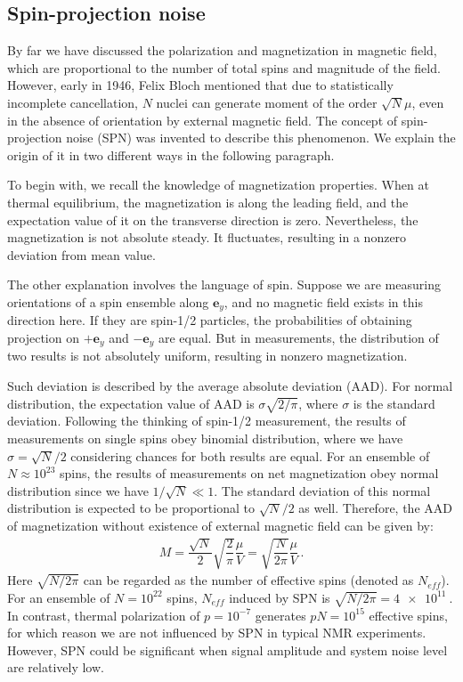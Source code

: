 \subsection{Spin-projection noise}\label{sec:intro:NMR:SPN}

By far we have discussed the polarization and magnetization in magnetic field, which are proportional to the number of total spins and magnitude of the field. However, early in 1946, Felix Bloch mentioned that due to statistically incomplete cancellation, $N$ nuclei can generate moment of the order $\sqrt{N}\mu$, even in the absence of orientation by external magnetic field\cite{Bloch_NuclearInduction_PhysRev.70.460}. The concept of spin-projection noise (SPN) was invented to describe this phenomenon. We explain the origin of it in two different ways in the following paragraph. 

To begin with, we recall the knowledge of magnetization properties. When at thermal equilibrium, the magnetization is along the leading field, and the expectation value of it on the transverse direction is zero. Nevertheless, the magnetization is not absolute steady. It fluctuates, resulting in a nonzero deviation from mean value. 

The other explanation involves the language of spin. Suppose we are measuring orientations of a spin ensemble along $\mathbf{e}_y$, and no magnetic field exists in this direction here. If they are spin-1/2 particles, the probabilities of obtaining projection on $+\mathbf{e}_y$ and $-\mathbf{e}_y$ are equal. But in measurements, the distribution of two results is not absolutely uniform, resulting in nonzero magnetization. 

Such deviation is described by the average absolute deviation (AAD). For normal distribution, the expectation value of AAD is $\sigma \sqrt{2/\pi}$, where $\sigma$ is the standard deviation. 
Following the thinking of spin-1/2 measurement, the results of measurements on single spins obey binomial distribution, where we have $\sigma = \sqrt{N}/2$ considering chances for both results are equal. For an ensemble of $N \approx 10^{23}$ spins, the results of measurements on net magnetization obey normal distribution since we have $1/\sqrt{N} \ll 1$. The standard deviation of this normal distribution is expected to be proportional to $\sqrt{N}/2$ as well. Therefore, the AAD of magnetization without existence of external magnetic field can be given by:
\begin{align}
    M = \dfrac{\sqrt{N}}{2} \sqrt{\dfrac{2}{\pi}} \dfrac{\mu}{V} = \sqrt{\dfrac{N}{2 \pi}} \dfrac{\mu}{V}\,.\label{eq:SPN_M}
\end{align}
Here $\sqrt{N/2 \pi}$ can be regarded as the number of effective spins (denoted as $N_{eff}$). For an ensemble of $N = 10^{22}$ spins, $N_{eff}$ induced by SPN is $\sqrt{N/2 \pi}=\SI{4e11}{}$. In contrast, thermal polarization of $p=10^{-7}$ generates $p N = 10^{15}$ effective spins, for which reason we are not influenced by SPN in typical NMR experiments. However, SPN could be significant when signal amplitude and system noise level are relatively low. 

